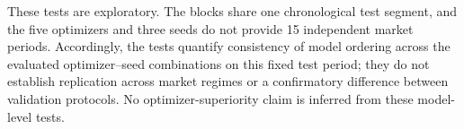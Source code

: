 These tests are exploratory. The blocks share one chronological test segment, and the five optimizers and three seeds do not provide 15 independent market periods. Accordingly, the tests quantify consistency of model ordering across the evaluated optimizer--seed combinations on this fixed test period; they do not establish replication across market regimes or a confirmatory difference between validation protocols. No optimizer-superiority claim is inferred from these model-level tests.
